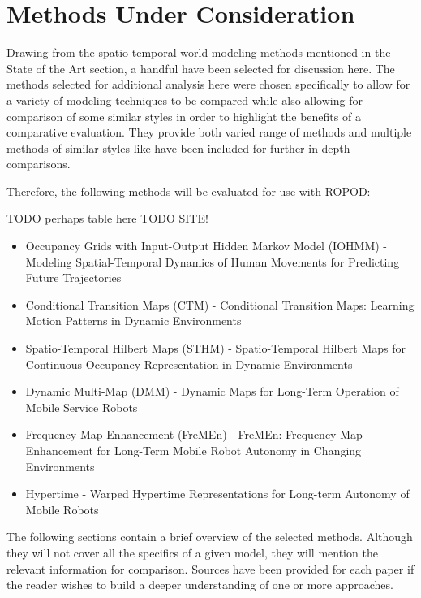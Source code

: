   \section{ Methods Under Consideration }

  Drawing from the spatio-temporal world modeling methods mentioned in the
  State of the Art section, a handful have been selected for discussion here.
  The methods selected for additional analysis here were chosen specifically
  to allow for a variety of modeling techniques to be compared while also
  allowing for comparison of some similar styles in order to highlight the
  benefits of a comparative evaluation.  They provide both varied range of
  methods and multiple methods of similar styles like have been included for
  further in-depth comparisons.

  Therefore, the following methods will be evaluated for use with ROPOD:

  TODO perhaps table here
  TODO SITE!
  \begin{itemize}
    \item Occupancy Grids with Input-Output Hidden Markov Model (IOHMM) - Modeling Spatial-Temporal Dynamics of Human Movements for Predicting Future Trajectories \cite{Wang2015}
    \item Conditional Transition Maps (CTM) - Conditional Transition Maps: Learning Motion Patterns in Dynamic Environments \cite{Kucner2013}
    \item Spatio-Temporal Hilbert Maps (STHM) - Spatio-Temporal Hilbert Maps for Continuous Occupancy Representation in Dynamic Environments \cite{Senanayake2016}
    \item Dynamic Multi-Map (DMM) - Dynamic Maps for Long-Term Operation of Mobile Service Robots \cite{biber2005}
    \item Frequency Map Enhancement (FreMEn) - FreMEn: Frequency Map Enhancement for Long-Term Mobile Robot Autonomy in Changing Environments \cite{Krajnik2015}
    \item Hypertime - Warped Hypertime Representations for Long-term Autonomy of Mobile Robots \cite{kranjik2018}
  \end{itemize}

  The following sections contain a brief overview of the selected methods.
  Although they will not cover all the specifics of a given model, they will
  mention the relevant information for comparison. Sources have been provided
  for each paper if the reader wishes to build a deeper understanding of one
  or more approaches.


